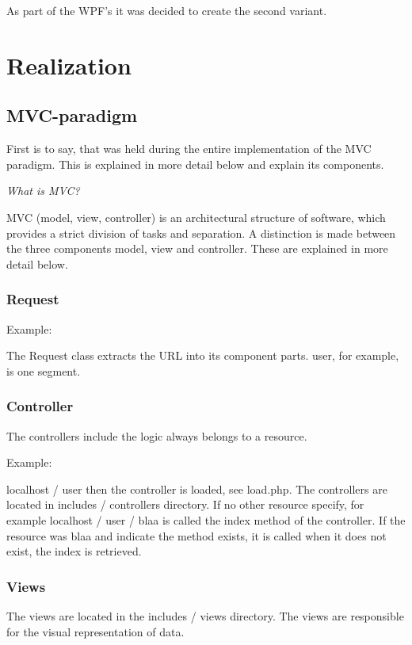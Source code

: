 \documentclass[a4paper,12pt,oneside]{article} %
\begin{document}
As part of the WPF's it was decided to create the second variant. 


\section{Realization}


\subsection{MVC-paradigm}

First is to say, that was held during the entire implementation of
the MVC paradigm. This is explained in more detail below and explain
its components. 

\emph{What is MVC? }

MVC (model, view, controller) is an architectural structure of software,
which provides a strict division of tasks and separation. A distinction
is made between the three components model, view and controller. These
are explained in more detail below.


\subsubsection*{Request}

Example: 

 The Request class extracts the URL into its component parts. user,
for example, is one segment.


\subsubsection*{Controller}

The controllers include the logic always belongs to a resource. 

Example: 


localhost / user
then the controller is loaded, see load.php. The controllers are
located in includes / controllers directory. If no other resource
specify, for example 
localhost / user / blaa
 is called the index method of the controller. If the resource was
blaa and indicate the method exists, it is called when it does not
exist, the index is retrieved.


\subsubsection*{Views}

The views are located in the 
includes / views
 directory. The views are responsible for the visual representation
of data.
\end{document}
